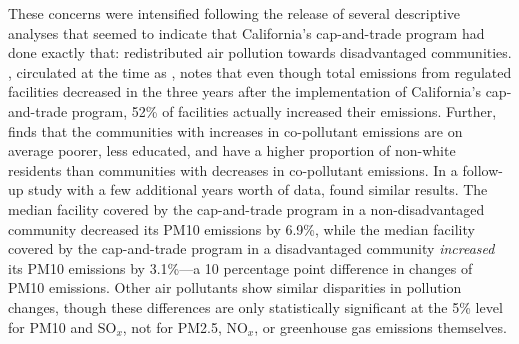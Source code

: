 



These concerns were intensified following the release of several descriptive analyses that seemed to indicate that California's cap-and-trade program had done exactly that: redistributed air pollution towards disadvantaged communities. \cite{cushing2018carbon}, circulated at the time as \cite{cushing2016preliminary}, notes that even though total emissions from regulated facilities decreased in the three years after the implementation of California's cap-and-trade program, 52\% of facilities actually increased their emissions. Further, \cite{cushing2018carbon} finds that the communities with increases in co-pollutant emissions are on average poorer, less educated, and have a higher proportion of non-white residents than communities with decreases in co-pollutant emissions. In a follow-up study with a few additional years worth of data, \cite{pastor2022up} found similar results. The median facility covered by the cap-and-trade program in a non-disadvantaged community decreased its PM10 emissions by 6.9\%, while the median facility covered by the cap-and-trade program in a disadvantaged community \emph{increased} its PM10 emissions by 3.1\%---a 10 percentage point difference in changes of PM10 emissions. Other air pollutants show similar disparities in pollution changes, though these differences are only statistically significant at the 5\% level for PM10 and SO$_x$, not for PM2.5, NO$_x$, or greenhouse gas emissions themselves. 

